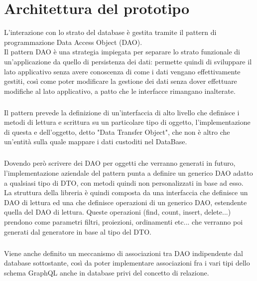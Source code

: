 \documentclass[a4paper, 12pt]{report}
\begin{document}
  \newpage  
  \chapter{Architettura del prototipo}
    L'interazione con lo strato del database è gestita tramite il pattern di programmazione Data Access Object (DAO).\\
    Il pattern DAO è una strategia impiegata per separare lo strato funzionale di un'applicazione da quello di persistenza dei dati: permette quindi di sviluppare il lato applicativo senza avere conoscenza di come i dati vengano effettivamente gestiti, così come poter modificare la gestione dei dati
    senza dover effettuare modifiche al lato applicativo, a patto che le interfacce rimangano inalterate.
    \paragraph*{}
    Il pattern prevede la definizione di un'interfaccia di alto livello che definisce i metodi di lettura e scrittura su un particolare tipo di oggetto, l'implementazione di questa e dell'oggetto, detto "Data Transfer Object", che non è altro che un'entità sulla quale mappare i dati custoditi nel DataBase.
    \paragraph*{}
    Dovendo però scrivere dei DAO per oggetti che verranno generati in futuro, l'implementazione aziendale del pattern punta a definire un generico DAO adatto a qualsiasi tipo di DTO, con metodi quindi non personalizzati in base ad esso.\\
    La struttura della libreria è quindi composta da una interfaccia che definisce un DAO di lettura ed una che definisce operazioni di un generico DAO, estendente quella del DAO di lettura.
    Queste operazioni (find, count, insert, delete...) prendono come parametri filtri, proiezioni, ordinamenti etc... che verranno poi generati dal generatore in base al tipo del DTO.
    \paragraph*{}
    Viene anche definito un meccanismo di associazioni tra DAO indipendente dal database sottostante, così da poter implementare associazioni fra i vari tipi dello schema GraphQL anche in database privi del concetto di relazione.
\end{document}
